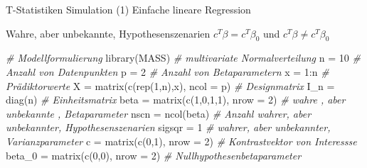 \documentclass[
  8pt,
  ignorenonframetext,
]{beamer}
\newenvironment{Shaded}{\begin{snugshade}}{\end{snugshade}}
\newcommand{\AttributeTok}[1]{\textcolor[rgb]{0.77,0.63,0.00}{#1}}
\newcommand{\CommentTok}[1]{\textcolor[rgb]{0.56,0.35,0.01}{\textit{#1}}}
\newcommand{\DecValTok}[1]{\textcolor[rgb]{0.00,0.00,0.81}{#1}}
\newcommand{\FunctionTok}[1]{\textcolor[rgb]{0.00,0.00,0.00}{#1}}
\newcommand{\NormalTok}[1]{#1}
\newcommand{\OtherTok}[1]{\textcolor[rgb]{0.56,0.35,0.01}{#1}}
\newcommand{\SpecialCharTok}[1]{\textcolor[rgb]{0.00,0.00,0.00}{#1}}
\begin{document}
\begin{frame}[fragile]{T-Statistiken}
\protect\hypertarget{t-statistiken-6}{}
Simulation (1) Einfache lineare Regression

\small

Wahre, aber unbekannte, Hypothesenszenarien \(c^T\beta = c^T\beta_0\)
und \(c^T\beta \neq c^T\beta_0\)

\vspace{2mm}
\tiny
{}

\begin{Shaded}
\begin{Highlighting}[]
\CommentTok{\# Modellformulierung}
\FunctionTok{library}\NormalTok{(MASS)                                                  }\CommentTok{\# multivariate Normalverteilung}
\NormalTok{n          }\OtherTok{=} \DecValTok{10}                                                \CommentTok{\# Anzahl von Datenpunkten}
\NormalTok{p          }\OtherTok{=} \DecValTok{2}                                                 \CommentTok{\# Anzahl von Betaparametern}
\NormalTok{x          }\OtherTok{=} \DecValTok{1}\SpecialCharTok{:}\NormalTok{n                                               }\CommentTok{\# Prädiktorwerte}
\NormalTok{X          }\OtherTok{=} \FunctionTok{matrix}\NormalTok{(}\FunctionTok{c}\NormalTok{(}\FunctionTok{rep}\NormalTok{(}\DecValTok{1}\NormalTok{,n),x), }\AttributeTok{ncol =}\NormalTok{ p)                   }\CommentTok{\# Designmatrix}
\NormalTok{I\_n        }\OtherTok{=} \FunctionTok{diag}\NormalTok{(n)                                           }\CommentTok{\# Einheitsmatrix}
\NormalTok{beta       }\OtherTok{=} \FunctionTok{matrix}\NormalTok{(}\FunctionTok{c}\NormalTok{(}\DecValTok{1}\NormalTok{,}\DecValTok{0}\NormalTok{,}\DecValTok{1}\NormalTok{,}\DecValTok{1}\NormalTok{), }\AttributeTok{nrow =} \DecValTok{2}\NormalTok{)                      }\CommentTok{\# wahre , aber unbekannte , Betaparameter}
\NormalTok{nscn       }\OtherTok{=} \FunctionTok{ncol}\NormalTok{(beta)                                        }\CommentTok{\# Anzahl wahrer, aber unbekannter, Hypothesenszenarien}
\NormalTok{sigsqr     }\OtherTok{=} \DecValTok{1}                                                 \CommentTok{\# wahrer, aber unbekannter, Varianzparameter}
\NormalTok{c          }\OtherTok{=} \FunctionTok{matrix}\NormalTok{(}\FunctionTok{c}\NormalTok{(}\DecValTok{0}\NormalTok{,}\DecValTok{1}\NormalTok{), }\AttributeTok{nrow =} \DecValTok{2}\NormalTok{)                          }\CommentTok{\# Kontrastvektor von Interessse}
\NormalTok{beta\_0     }\OtherTok{=} \FunctionTok{matrix}\NormalTok{(}\FunctionTok{c}\NormalTok{(}\DecValTok{0}\NormalTok{,}\DecValTok{0}\NormalTok{), }\AttributeTok{nrow =} \DecValTok{2}\NormalTok{)                          }\CommentTok{\# Nullhypothesenbetaparameter}


\end{Highlighting}
\end{Shaded}
\end{frame}
\end{document}
